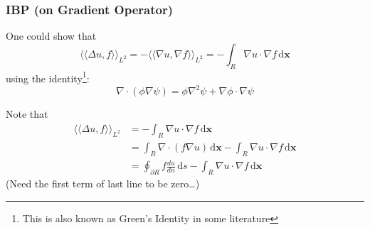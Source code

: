 \documentclass[a4paper]{article}
\newcommand{\llangle}{\langle \langle}
\newcommand{\rrangle}{\rangle \rangle}
\newcommand{\dxx}{\, \text{d} \mathbf{x}}
\theoremstyle{definition}
\begin{document}
%
%

\subsubsection{IBP (on Gradient Operator)}
One could show that 
\begin{equation}
    \llangle \Delta u, f \rrangle_{L^2} = - \llangle \nabla u, \nabla f \rrangle_{L^2} = - \int_{R} \nabla u \cdot \nabla f \dxx
    \label{equ: IBP Gradient}
\end{equation}
using the identity\footnote{This is also known as Green's Identity in some literature}:
\begin{equation}
\nabla \cdot \left( \phi \nabla \psi \right) = \phi \nabla^2 \psi + \nabla \phi \cdot \nabla \psi
    \label{equ: Green's Identity II}
\end{equation}

Note that
\begin{align}
    \llangle \Delta u, f \rrangle_{L^2} &= - \int_R \nabla u \cdot \nabla f \dxx \\
    &= \int_R \nabla \cdot \left( f \nabla u \right) \dxx - \int_R \nabla u \cdot \nabla f \dxx \\
    &= \oint_{\partial R} f \frac{du}{dn} \, \text{d} s - \int_R \nabla u \cdot \nabla f \dxx
\end{align}
(Need the first term of last line to be zero\dots)
\end{document}
